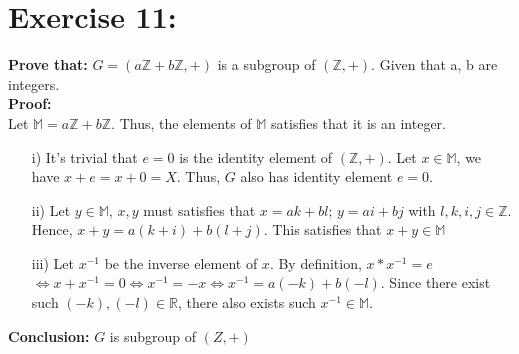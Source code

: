 \documentclass{article}
\newcommand{\Z}{\mathbb{Z}}
\newcommand{\R}{\mathbb{R}}
\begin{document}
	\section{Exercise 11:}
		\textbf{Prove that:} $G = (a\Z+b\Z, +)$ is a subgroup of $(\Z, +)$. Given that a, b are integers.\\
		\textbf{Proof:}\\
		Let $\mathbb{M} = a\Z+b\Z$. Thus, the elements of $\mathbb{M}$ satisfies that it is an integer.
		\begin{enumerate}
			\item [i)] 
				It's trivial that $e=0$ is the identity element of $(\Z, +)$. Let $x \in \mathbb{M}$, we have $x+e = x+0 = X$. Thus, $G$ also has identity element $e=0$.
			\item[ii)]
				Let $y \in \mathbb{M}$, $x, y$ must satisfies that $x = ak+bl$; $y = ai+bj$ with $l, k, i, j \in \Z$.
				Hence, $x+y = a(k+i) + b(l+j)$. This satisfies that $x+y \in \mathbb{M}$
			\item[iii)]
				Let $x^{-1}$ be the inverse element of $x$. By definition, $x*x^{-1} = e$\\ 
				$\iff x + x^{-1} = 0 \iff x^{-1} = -x \iff x^{-1} = a(-k)+b(-l)$. Since there exist such $(-k), (-l) \in \R$, there also exists such $x^{-1} \in \mathbb{M}$.
		\end{enumerate}
		\textbf{Conclusion:} $G$ is subgroup of $(Z,+)$
\end{document}
